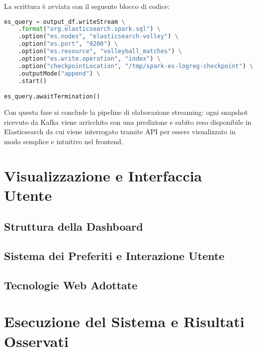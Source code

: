 \documentclass[a4paper,12pt]{report}
\begin{document}
\newpage

La scrittura è avviata con il seguente blocco di codice:

\begin{lstlisting}[language=Python]
es_query = output_df.writeStream \
    .format("org.elasticsearch.spark.sql") \
    .option("es.nodes", "elasticsearch-volley") \
    .option("es.port", "9200") \
    .option("es.resource", "volleyball_matches") \
    .option("es.write.operation", "index") \
    .option("checkpointLocation", "/tmp/spark-es-logreg-checkpoint") \
    .outputMode("append") \
    .start()

es_query.awaitTermination()
\end{lstlisting}

Con questa fase si conclude la pipeline di elaborazione streaming: ogni snapshot ricevuto da Kafka viene arricchito con una predizione e subito reso disponibile in Elasticsearch da cui viene interrogato tramite API per essere visualizzato in modo semplice e intuitivo nel frontend.





\chapter{Visualizzazione e Interfaccia Utente}

\section{Struttura della Dashboard}

\section{Sistema dei Preferiti e Interazione Utente}

\section{Tecnologie Web Adottate}



\chapter{Esecuzione del Sistema e Risultati Osservati}
\end{document}
